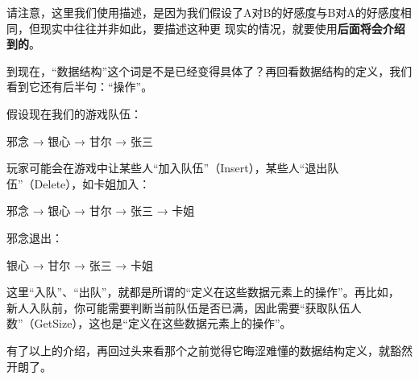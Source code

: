 \begin{bulk}
\begin{center}
\end{center}
\end{bulk}
请注意，这里我们使用描述，是因为我们假设了A对B的好感度与B对A的好感度相同，但现实中往往并非如此，要描述这种更
现实的情况，就要使用{\color{red}\textbf{后面将会介绍到的}}。

到现在，“数据结构”这个词是不是已经变得具体了？再回看数据结构的定义，我们看到它还有后半句：“操作”。

假设现在我们的游戏队伍：
\begin{bulk}
\begin{center}
邪念 → 银心 → 甘尔 → 张三
\end{center}
\end{bulk}
玩家可能会在游戏中让某些人“加入队伍”（Insert），某些人“退出队伍”（Delete），如卡姐加入：
\begin{bulk}
\begin{center}
邪念 → 银心 → 甘尔 → 张三 → 卡姐
\end{center}
\end{bulk}
邪念退出：
\begin{bulk}
\begin{center}
银心 → 甘尔 → 张三 → 卡姐
\end{center}
\end{bulk}
这里“入队”、“出队”，就都是所谓的“定义在这些数据元素上的操作”。再比如，
新人入队前，你可能需要判断当前队伍是否已满，因此需要“获取队伍人数”（GetSize），这也是“定义在这些数据元素上的操作”。

有了以上的介绍，再回过头来看那个之前觉得它晦涩难懂的数据结构定义，就豁然开朗了。

